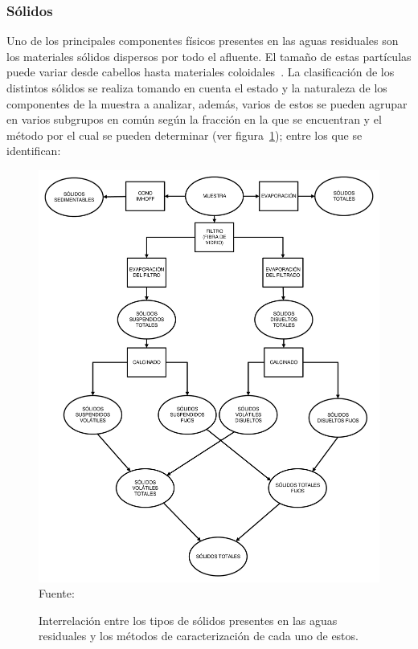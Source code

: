 \subsubsection{Sólidos}
Uno de los principales componentes físicos presentes en las aguas residuales son los materiales sólidos dispersos por todo el afluente. El tamaño de estas partículas puede variar desde cabellos hasta materiales coloidales~\citep{metcalf2003}. 
La clasificación de los distintos sólidos se realiza tomando en cuenta el estado y la naturaleza de los componentes de la muestra a analizar, además, varios de estos se pueden agrupar en varios subgrupos en común según la fracción en la que se encuentran y el método por el cual se pueden determinar (ver figura~\ref{fig:solrelcn}); entre los que se identifican:
\begin{figure}[H]
	\centering
	\includegraphics[scale=0.25]{../Images/Relacion_Solidos.pdf}
	\\\small{Fuente: \cite{metcalf2003}}
	\caption{Interrelación entre los tipos de sólidos presentes en las aguas residuales y los métodos de caracterización de cada uno de estos.}\label{fig:solrelcn}
\end{figure}

